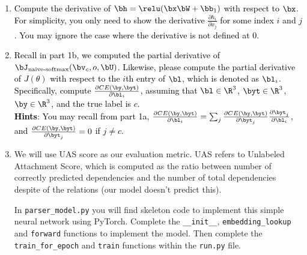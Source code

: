 \begin{parts}
    \begin{enumerate}[label=\roman*.]
    
        \item \textcolor{black}{Compute the derivative of $\bh = \relu(\bx \bW + \bb_1)$ with respect to $\bx$. For simplicity, you only need to show the derivative $\frac{\partial h_i}{\partial x_j}$ for some index $i$ and $j$. You may ignore the case where the derivative is not defined at 0.}
        

        \item \textcolor{black}{Recall in part 1b, we computed the partial derivative of $\bJ_{\text{naive-softmax}}(\bv_c, o, \bU)$. Likewise, please compute the partial derivative of $J(\theta)$ with respect to the $i$th entry of $\bl$, which is denoted as $\bl_i$. Specifically, compute $\frac{\partial CE(\by, \byt)}{\partial \bl_i}$, assuming that $\bl \in \R^3$, $\byt \in \R^3$, $\by \in \R^3$, and the true label is $c$. \\
        \textbf{Hints}: You may recall from part 1a, $\frac{\partial CE(\by, \byt)}{\partial \bl_i} = \sum_j \frac{\partial CE(\by, \byt)}{\partial \byt_j}\frac{\partial \byt_j}{\partial \bl_i}$, and $\frac{\partial CE(\by, \byt)}{\partial \byt_j}=0$ if $j \neq c$. 
        }


        \item We will use UAS score as our evaluation metric. UAS refers to Unlabeled Attachment Score, which is computed as the ratio between number of correctly predicted dependencies and the number of total dependencies despite of the relations (our model doesn't predict this).\newline
    
   In \texttt{parser\_model.py} you will find skeleton code to implement this simple neural network using PyTorch. Complete the \texttt{\_\_init\_\_}, \texttt{embedding\_lookup} and \texttt{forward} functions to implement the model. Then complete the \texttt{train\_for\_epoch} and \texttt{train} functions within the \texttt{run.py} file.
   

\end{enumerate}
\end{parts}
